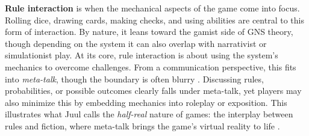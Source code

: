 \textbf{Rule interaction} is when the mechanical aspects of the game come into focus. Rolling dice, drawing cards, making checks, and using abilities are central to this form of interaction. By nature, it leans toward the gamist side of GNS theory, though depending on the system it can also overlap with narrativist or simulationist play. At its core, rule interaction is about using the system’s mechanics to overcome challenges. From a communication perspective, this fits into \textit{meta-talk}, though the boundary is often blurry \cite{bowman2010social}. Discussing rules, probabilities, or possible outcomes clearly falls under meta-talk, yet players may also minimize this by embedding mechanics into roleplay or exposition. This illustrates what Juul calls the \textit{half-real} nature of games: the interplay between rules and fiction, where meta-talk brings the game’s virtual reality to life \cite{juul2005half}.
